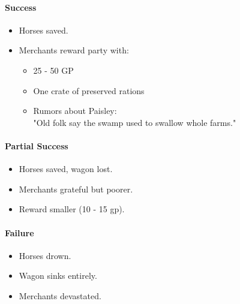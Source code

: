 \paragraph*{Success}
\begin{itemize}
	\item Horses saved.
	\item Merchants reward party with:
	\begin{itemize}
		\item 25 - 50 GP
		\item One crate of preserved rations
		\item Rumors about Paisley:\\"Old folk say the swamp used to swallow whole farms."
	\end{itemize}
\end{itemize}
\paragraph*{Partial Success}
\begin{itemize}
	\item Horses saved, wagon lost.
	\item Merchants grateful but poorer.
	\item Reward smaller (10 - 15 gp).
\end{itemize}
\paragraph*{Failure}
\begin{itemize}
	\item Horses drown.
	\item Wagon sinks entirely.
	\item Merchants devastated.
\end{itemize}